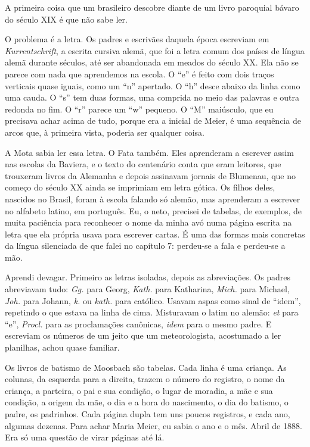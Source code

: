 \documentclass[
  brazilian,
  11pt,
  openany]{book}
\begin{document}
A primeira coisa que um brasileiro descobre diante de um livro paroquial
bávaro do século XIX é que não sabe ler.

O problema é a letra. Os padres e escrivães daquela época escreviam em
\emph{Kurrentschrift}, a escrita cursiva alemã, que foi a letra comum
dos países de língua alemã durante séculos, até ser abandonada em meados
do século XX. Ela não se parece com nada que aprendemos na escola. O
``e'' é feito com dois traços verticais quase iguais, como um ``n''
apertado. O ``h'' desce abaixo da linha como uma cauda. O ``s'' tem duas
formas, uma comprida no meio das palavras e outra redonda no fim. O
``r'' parece um ``w'' pequeno. O ``M'' maiúsculo, que eu precisava achar
acima de tudo, porque era a inicial de Meier, é uma sequência de arcos
que, à primeira vista, poderia ser qualquer coisa.

A Mota sabia ler essa letra. O Fata também. Eles aprenderam a escrever
assim nas escolas da Baviera, e o texto do centenário conta que eram
leitores, que trouxeram livros da Alemanha e depois assinavam jornais de
Blumenau, que no começo do século XX ainda se imprimiam em letra gótica.
Os filhos deles, nascidos no Brasil, foram à escola falando só alemão,
mas aprenderam a escrever no alfabeto latino, em português. Eu, o neto,
precisei de tabelas, de exemplos, de muita paciência para reconhecer o
nome da minha avó numa página escrita na letra que ela própria usava
para escrever cartas. É uma das formas mais concretas da língua
silenciada de que falei no capítulo 7: perdeu-se a fala e perdeu-se a
mão.

Aprendi devagar. Primeiro as letras isoladas, depois as abreviações. Os
padres abreviavam tudo: \emph{Gg.} para Georg, \emph{Kath.} para
Katharina, \emph{Mich.} para Michael, \emph{Joh.} para Johann, \emph{k.}
ou \emph{kath.} para católico. Usavam aspas como sinal de ``idem'',
repetindo o que estava na linha de cima. Misturavam o latim no alemão:
\emph{et} para ``e'', \emph{Procl.} para as proclamações canônicas,
\emph{idem} para o mesmo padre. E escreviam os números de um jeito que
um meteorologista, acostumado a ler planilhas, achou quase familiar.

Os livros de batismo de Moosbach são tabelas. Cada linha é uma criança.
As colunas, da esquerda para a direita, trazem o número do registro, o
nome da criança, a parteira, o pai e sua condição, o lugar de moradia, a
mãe e sua condição, a origem da mãe, o dia e a hora do nascimento, o dia
do batismo, o padre, os padrinhos. Cada página dupla tem uns poucos
registros, e cada ano, algumas dezenas. Para achar Maria Meier, eu sabia
o ano e o mês. Abril de 1888. Era só uma questão de virar páginas até
lá.
\end{document}
